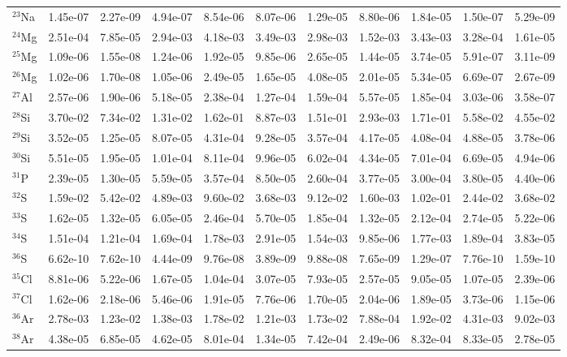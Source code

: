 \begin{landscape}
\begin{table}
\begin{tabular}{l|cc|cc|cc|cc|cc}
$^{23}$Na & 1.45e-07 & 2.27e-09 & 4.94e-07 & 8.54e-06 & 8.07e-06 & 1.29e-05 & 8.80e-06 & 1.84e-05 & 1.50e-07 & 5.29e-09\\
$^{24}$Mg & 2.51e-04 & 7.85e-05 & 2.94e-03 & 4.18e-03 & 3.49e-03 & 2.98e-03 & 1.52e-03 & 3.43e-03 & 3.28e-04 & 1.61e-05\\
$^{25}$Mg & 1.09e-06 & 1.55e-08 & 1.24e-06 & 1.92e-05 & 9.85e-06 & 2.65e-05 & 1.44e-05 & 3.74e-05 & 5.91e-07 & 3.11e-09\\
$^{26}$Mg & 1.02e-06 & 1.70e-08 & 1.05e-06 & 2.49e-05 & 1.65e-05 & 4.08e-05 & 2.01e-05 & 5.34e-05 & 6.69e-07 & 2.67e-09\\
$^{27}$Al & 2.57e-06 & 1.90e-06 & 5.18e-05 & 2.38e-04 & 1.27e-04 & 1.59e-04 & 5.57e-05 & 1.85e-04 & 3.03e-06 & 3.58e-07\\
$^{28}$Si & 3.70e-02 & 7.34e-02 & 1.31e-02 & 1.62e-01 & 8.87e-03 & 1.51e-01 & 2.93e-03 & 1.71e-01 & 5.58e-02 & 4.55e-02\\
$^{29}$Si & 3.52e-05 & 1.25e-05 & 8.07e-05 & 4.31e-04 & 9.28e-05 & 3.57e-04 & 4.17e-05 & 4.08e-04 & 4.88e-05 & 3.78e-06\\
$^{30}$Si & 5.51e-05 & 1.95e-05 & 1.01e-04 & 8.11e-04 & 9.96e-05 & 6.02e-04 & 4.34e-05 & 7.01e-04 & 6.69e-05 & 4.94e-06\\
$^{31}$P & 2.39e-05 & 1.30e-05 & 5.59e-05 & 3.57e-04 & 8.50e-05 & 2.60e-04 & 3.77e-05 & 3.00e-04 & 3.80e-05 & 4.40e-06\\
$^{32}$S & 1.59e-02 & 5.42e-02 & 4.89e-03 & 9.60e-02 & 3.68e-03 & 9.12e-02 & 1.60e-03 & 1.02e-01 & 2.44e-02 & 3.68e-02\\
$^{33}$S & 1.62e-05 & 1.32e-05 & 6.05e-05 & 2.46e-04 & 5.70e-05 & 1.85e-04 & 1.32e-05 & 2.12e-04 & 2.74e-05 & 5.22e-06\\
$^{34}$S & 1.51e-04 & 1.21e-04 & 1.69e-04 & 1.78e-03 & 2.91e-05 & 1.54e-03 & 9.85e-06 & 1.77e-03 & 1.89e-04 & 3.83e-05\\
$^{36}$S & 6.62e-10 & 7.62e-10 & 4.44e-09 & 9.76e-08 & 3.89e-09 & 9.88e-08 & 7.65e-09 & 1.29e-07 & 7.76e-10 & 1.59e-10\\
$^{35}$Cl & 8.81e-06 & 5.22e-06 & 1.67e-05 & 1.04e-04 & 3.07e-05 & 7.93e-05 & 2.57e-05 & 9.05e-05 & 1.07e-05 & 2.39e-06\\
$^{37}$Cl & 1.62e-06 & 2.18e-06 & 5.46e-06 & 1.91e-05 & 7.76e-06 & 1.70e-05 & 2.04e-06 & 1.89e-05 & 3.73e-06 & 1.15e-06\\
$^{36}$Ar & 2.78e-03 & 1.23e-02 & 1.38e-03 & 1.78e-02 & 1.21e-03 & 1.73e-02 & 7.88e-04 & 1.92e-02 & 4.31e-03 & 9.02e-03\\
$^{38}$Ar & 4.38e-05 & 6.85e-05 & 4.62e-05 & 8.01e-04 & 1.34e-05 & 7.42e-04 & 2.49e-06 & 8.32e-04 & 8.33e-05 & 2.78e-05\\

\end{tabular}
\end{table}
\end{landscape}
